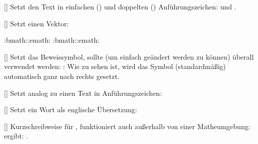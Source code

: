 %
%
%

[\cmdlist{}]
Setzt den Text in einfachen () und doppelten () Anführungszeichen:  und .

%
%
%

[\cmdlist{}]
Setzt einen Vektor:
\begin{plainlatex}
:bmath::emath: %
:bmath::emath: %
\end{plainlatex}

%
%
%

[]
Setzt das Beweissymbol, sollte (um einfach geändert werden zu können) überall verwendet werden: : \qedsymbol\newline
Wie zu sehen ist, wird das Symbol (standardmäßig) automatisch ganz nach rechts gesetzt.

%
%
%

[]%
Setzt analog zu  einen Text in Anführungszeichen:
\begin{latex*}
\end{latex*}

%
%
%

[]
Setzt ein Wort als englische Übersetzung:
\begin{latex*}
\end{latex*}

%
%
%

[]
Kurzschreibweise für , funktioniert auch außerhalb von einer Matheumgebung:  ergibt: \cd.

